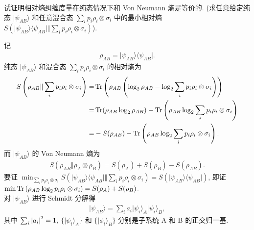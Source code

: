 \documentclass{assignment}
\begin{document}
\begin{prob}
    试证明相对熵纠缠度量在纯态情况下和 Von Neumann 熵是等价的. (求任意给定纯态 $\lvert\psi_{AB}\rangle$ 和任意混合态 $\sum_ip_i\rho_i\otimes\sigma_i$ 中的最小相对熵 $S\left(\lvert\psi_{AB}\rangle\langle\psi_{AB}\rvert\Vert\sum_ip_i\rho_i\otimes\sigma_i\right)$).
\end{prob}
\begin{pf}
    记
    \begin{align}
        \rho_{AB}=\lvert\psi_{AB}\rangle\langle\psi_{AB}\rvert.
    \end{align}
    纯态 $\lvert\psi_{AB}\rangle$ 和混合态 $\sum_ip_i\rho_i\otimes\sigma_i$ 的相对熵为
    \begin{align}
        \notag S\left(\rho_{AB}\Vert\sum_ip_i\rho_i\otimes\sigma_i\right)=&\operatorname{Tr}\left(\rho_{AB}\left(\log_2\rho_{AB}-\log_2\sum_ip_i\rho_i\otimes\sigma_i\right)\right)\\
        \notag=&\operatorname{Tr}(\rho_{AB}\log_2\rho_{AB})-\operatorname{Tr}\left(\rho_{AB}\log_2\sum_ip_i\rho_i\otimes\sigma_i\right)\\
        =&-S(\rho_{AB})-\operatorname{Tr}\left(\rho_{AB}\log_2\sum_ip_i\rho_i\otimes\sigma_i\right).
    \end{align}
    而 $\lvert\psi_{AB}\rangle$ 的 Von Neumann 熵为
    \begin{align}
        S(\rho_{AB}\Vert\rho_A\otimes\rho_B)=S(\rho_A)+S(\rho_B)-S(\rho_{AB}).
    \end{align}
    要证 $\min_{\sum_ip_i\rho_i\otimes\sigma_i}S\left(\lvert\psi_{AB}\rangle\langle\psi_{AB}\rvert\Vert\sum_ip_i\rho_i\otimes\sigma_i\right)=S(\lvert\psi_{AB}\rangle\langle\psi_{AB}\rvert)$, 即证 $\min\operatorname{Tr}\left(\rho_{AB}\log_2p_i\rho_i\otimes\sigma_i\right)=S(\rho_A)+S(\rho_B)$.\\
    对 $\lvert\psi_{AB}\rangle$ 进行 Schmidt 分解得
    \begin{align}
        \lvert\psi_{AB}\rangle=\sum_ia_i\lvert\psi_i\rangle_A\lvert\psi_i\rangle_B,
    \end{align}
    其中 $\sum_i\left\lvert a_i\right\rvert^2=1$, $\{\lvert\psi_i\rangle_A\}$ 和 $\{\lvert\phi_i\rangle_B\}$ 分别是子系统 A 和 B 的正交归一基.
\end{pf}
\end{document}
